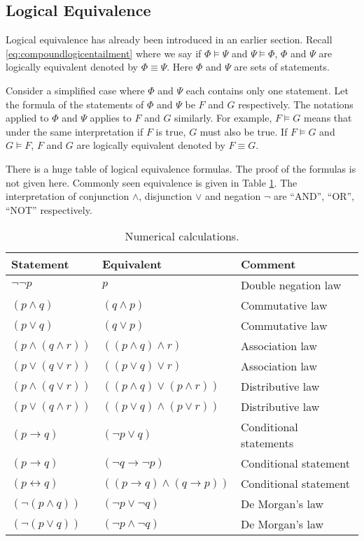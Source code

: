 \subsection{Logical Equivalence}

Logical equivalence has already been introduced in an earlier section. Recall \eqref{eq:compoundlogicentailment} where we say if $\Phi \models \Psi$ and $\Psi \models \Phi$, $\Phi$ and $\Psi$ are logically equivalent denoted by $\Phi \equiv \Psi$. Here $\Phi$ and $\Psi$ are sets of statements.

Consider a simplified case where $\Phi$ and $\Psi$ each contains only one statement. Let the formula of the statements of $\Phi$ and $\Psi$ be $F$ and $G$ respectively. The notations applied to $\Phi$ and $\Psi$ applies to $F$ and $G$ similarly. For example, $F\models G$ means that under the same interpretation if $F$ is true, $G$ must also be true. If $F \models G$ and $G \models F$, $F$ and $G$ are logically equivalent denoted by $F\equiv G$.

There is a huge table of logical equivalence formulas. The proof of the formulas is not given here. Commonly seen equivalence is given in Table \ref{tab:logicalequivalence}. The interpretation of conjunction $\land$, disjunction $\lor$ and negation $\neg$ are ``AND'', ``OR'', ``NOT'' respectively.
\begin{table}
	\centering \caption{Numerical calculations.} \label{tab:logicalequivalence}
	\begin{tabularx}{\textwidth}{llX}
		\hline
		Statement & Equivalent & Comment \\
		\hline
		$\neg \neg p$ & $p$ & Double negation law \\
		$(p \land q)$ & $(q \land p)$ & Commutative law \\
		$(p \lor q)$ & $(q \lor p)$ & Commutative law \\
		$(p \land (q \land r))$ & $((p \land q) \land r)$ & Association law \\
		$(p \lor (q \lor r))$ & $((p \lor q) \lor r)$ & Association law \\
		$(p \land (q \lor r))$ & $((p \land q) \lor (p \land r))$ & Distributive law \\
		$(p \lor (q \land r))$ & $((p \lor q) \land (p \lor r))$ & Distributive law \\
		$(p \rightarrow q)$ & $(\neg p \lor q)$ & Conditional statements \\
		$(p \rightarrow q)$ & $(\neg q \rightarrow \neg p)$ & Conditional statement \\
		$(p \leftrightarrow q)$ & $((p \rightarrow q) \land (q \rightarrow p))$ & Conditional statement \\
		$(\neg (p \land q))$ & $(\neg p \lor \neg q)$ & De Morgan's law \\
		$(\neg (p \lor q))$ & $(\neg p \land \neg q)$ & De Morgan's law \\
		\hline
	\end{tabularx}
\end{table}

